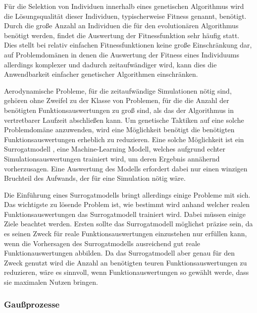 \label{sub:surrogate}
Für die Selektion von Individuen innerhalb eines genetischen Algorithmus wird die Lösungsqualität dieser Individuen, typischerweise Fitness genannt, benötigt.
Durch die große Anzahl an Individuen die für den evolutionären Algorithmus benötigt werden, findet die Auswertung der Fitnessfunktion sehr häufig statt.
Dies stellt bei relativ einfachen Fitnessfunktionen keine große Einschränkung dar, auf Problemdomänen in denen die Auswertung der Fitness eines Individuums allerdings komplexer und dadurch zeitaufwändiger wird, kann dies die Anwendbarkeit einfacher genetischer Algorithmen einschränken.

Aerodynamische Probleme, für die zeitaufwändige Simulationen nötig sind, gehören ohne Zweifel zu der Klasse von Problemen, für die die Anzahl der benötigten Funktionsauswertungen zu groß sind, als das der Algorithmus in vertretbarer Laufzeit abschließen kann.
Um genetische Taktiken auf eine solche Problemdomäne anzuwenden, wird eine Möglichkeit benötigt die benötigten Funktionsauswertungen erheblich zu reduzieren.
Eine solche Möglichkeit ist ein Surrogatmodell \cite{Jin.2011}\cite{Preen.2016}, eine Machine-Learning Modell, welches aufgrund echter Simulationsauswertungen trainiert wird, um deren Ergebnis annähernd vorherzusagen.
Eine Auswertung des Modells erfordert dabei nur einen winzigen Bruchteil des Aufwands, der für eine Simulation nötig wäre.

Die Einführung eines Surrogatmodells bringt allerdings einige Probleme mit sich.
Das wichtigste zu lösende Problem ist, wie bestimmt wird anhand welcher realen Funktionsauswertungen das Surrogatmodell trainiert wird.
Dabei müssen einige Ziele beachtet werden.
Ersten sollte das Surrogatmodell möglichst präzise sein, da es seinen Zweck für reale Funktionsauswertungen einzustehen nur erfüllen kann, wenn die Vorhersagen des Surrogatmodells ausreichend gut reale Funktionauswertungen abbilden.
Da das Surrogatmodell aber genau für den Zweck genutzt wird die Anzahl an benötigten teuren Funktionsauswertungen zu reduzieren, wäre es sinnvoll, wenn Funktionauswertungen so gewählt werde, dass sie maximalen Nutzen bringen.


\subsubsection{Gaußprozesse}


